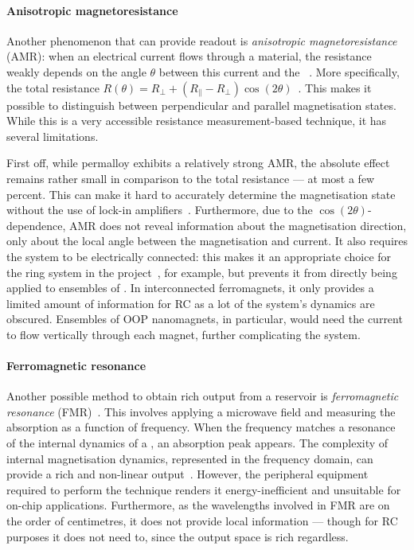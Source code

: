 \paragraph{Anisotropic magnetoresistance}
Another phenomenon that can provide readout is \emph{anisotropic magnetoresistance} (AMR): when an electrical current flows through a  material, the resistance weakly depends on the angle $\theta$ between this current and the ~\cite{AMR}.
More specifically, the total resistance $R(\theta) = R_\perp + (R_\parallel - R_\perp) \cos(2\theta)$~\cite{Hu2023}.
This makes it possible to distinguish between perpendicular and parallel magnetisation states.
While this is a very accessible resistance measurement-based technique, it has several limitations. \par
First off, while permalloy exhibits a relatively strong AMR, the absolute effect remains rather small in comparison to the total resistance --- at most a few percent.
This can make it hard to accurately determine the magnetisation state without the use of lock-in amplifiers~\cite{ArchitecturesNanoringRC,Vidamour2023}.
Furthermore, due to the $\cos(2 \theta)$-dependence, AMR does not reveal information about the magnetisation direction, only about the local angle between the magnetisation and current.
It also requires the system to be electrically connected: this makes it an appropriate choice for the ring system in the \spinengine project~\cite{Vidamour2023,ArchitecturesNanoringRC,DynamicEmergence_NanomagneticSystem}, for example, but prevents it from directly being applied to ensembles of .
In interconnected ferromagnets, it only provides a limited amount of information for RC as a lot of the system's dynamics are obscured.
Ensembles of OOP nanomagnets, in particular, would need the current to flow vertically through each magnet, further complicating the system.

\paragraph{Ferromagnetic resonance}
Another possible method to obtain rich output from a reservoir is \emph{ferromagnetic resonance} (FMR)~\cite{AdaptiveProgrammableRC,gartside2022reconfigurable}.
This involves applying a microwave field and measuring the absorption as a function of frequency.
When the frequency matches a resonance of the internal  dynamics of a , an absorption peak appears.
The complexity of internal magnetisation dynamics, represented in the frequency domain, can provide a rich and non-linear  output~\cite{AdaptiveProgrammableRC,Gomez-Iriarte_FMR}.
However, the peripheral equipment required to perform the technique renders it energy-inefficient and unsuitable for on-chip applications.
Furthermore, as the wavelengths involved in FMR are on the order of centimetres, it does not provide local information --- though for RC purposes it does not need to, since the output space is rich regardless.

